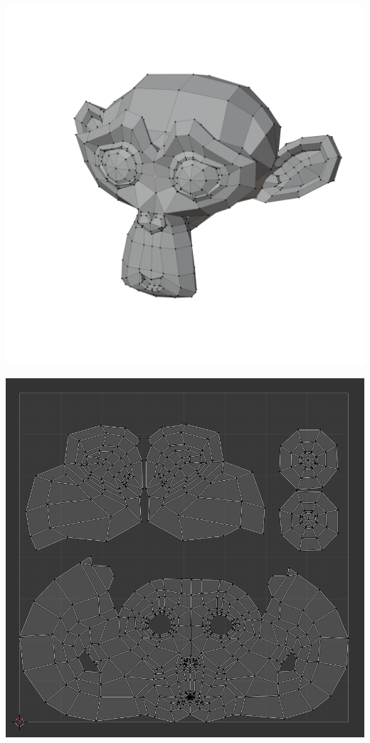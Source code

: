 \documentclass[11pt,class=report,crop=false]{standalone}
\begin{document}
\begin{center}
\begin{minipage}{0.5\textwidth}
	\includegraphics[scale=\myscale,scale=0.20,trim={5cm 3cm 1cm 2.5cm},clip]{figures/uv-map-02-new}    
\end{minipage}\quad
\begin{minipage}{0.45\textwidth}
	\includegraphics[scale=\myscale,scale=0.19]{figures/uv-map-01}    
\end{minipage}
\end{center}
\end{document}
